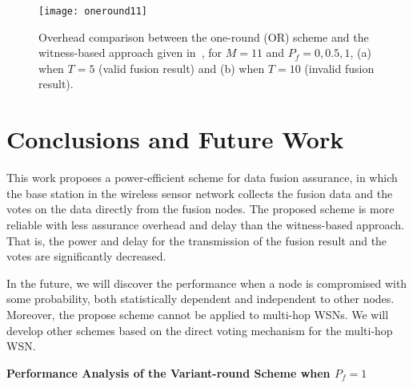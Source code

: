 \documentclass[12pt, onecolumn, draftcls]{IEEEtran}
\begin{document}
\begin{figure}
\centering
\texttt{[image: oneround11]}
\caption{Overhead comparison between the one-round (OR) scheme and
the witness-based approach given in~\cite{du:assurance}, for $M=11$
and $P_f=0,0.5,1$, (a) when $T=5$ (valid fusion result) and (b) when
$T=10$ (invalid fusion result).} \label{fig:oneround11}
\end{figure}

\section{Conclusions and Future Work}
\label{sec:conclusions} This work proposes a power-efficient scheme
for data fusion assurance, in which the base station in the wireless
sensor network collects the fusion data and the votes on the data
directly from the fusion nodes. The proposed scheme is more reliable
with less assurance overhead and delay than the witness-based
approach. That is, the power and delay for the transmission of the
fusion result and the votes are significantly decreased.

In the future, we will discover the performance when a node is
compromised with some probability, both statistically dependent and
independent to other nodes. Moreover, the propose scheme cannot be
applied to multi-hop WSNs. We will develop other schemes based on
the direct voting mechanism for the multi-hop WSN.


\appendix

\begin{center}{\bf Performance Analysis of the Variant-round Scheme when
$P_f=1$}\end{center}
\end{document}
